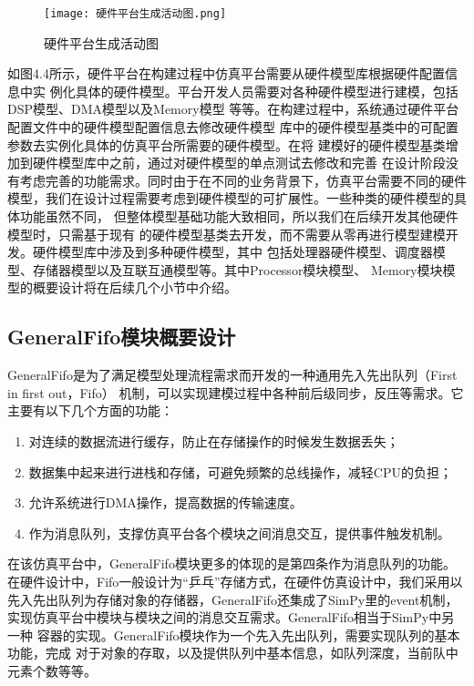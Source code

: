 \begin{figure}[h]
    \centering
    \texttt{[image: 硬件平台生成活动图.png]}
    \caption{硬件平台生成活动图}
    \label{fig:badge}
\end{figure}

如图4.4所示，硬件平台在构建过程中仿真平台需要从硬件模型库根据硬件配置信息中实
例化具体的硬件模型。平台开发人员需要对各种硬件模型进行建模，包括DSP模型、DMA模型以及Memory模型
等等。在构建过程中，系统通过硬件平台配置文件中的硬件模型配置信息去修改硬件模型
库中的硬件模型基类中的可配置参数去实例化具体的仿真平台所需要的硬件模型。在将
建模好的硬件模型基类增加到硬件模型库中之前，通过对硬件模型的单点测试去修改和完善
在设计阶段没有考虑完善的功能需求。同时由于在不同的业务背景下，仿真平台需要不同的硬件
模型，我们在设计过程需要考虑到硬件模型的可扩展性。一些种类的硬件模型的具体功能虽然不同，
但整体模型基础功能大致相同，所以我们在后续开发其他硬件模型时，只需基于现有
的硬件模型基类去开发，而不需要从零再进行模型建模开发。硬件模型库中涉及到多种硬件模型，其中
包括处理器硬件模型、调度器模型、存储器模型以及互联互通模型等。其中Processor模块模型、
Memory模块模型的概要设计将在后续几个小节中介绍。

\subsection{GeneralFifo模块概要设计}
GeneralFifo是为了满足模型处理流程需求而开发的一种通用先入先出队列（First in first out，Fifo）
机制\cite{31}，可以实现建模过程中各种前后级同步，反压等需求。它主要有以下几个方面的功能：

\begin{enumerate}
    \item 对连续的数据流进行缓存，防止在存储操作的时候发生数据丢失；
    \item 数据集中起来进行进栈和存储，可避免频繁的总线操作，减轻CPU的负担；
    \item 允许系统进行DMA操作，提高数据的传输速度。
    \item 作为消息队列，支撑仿真平台各个模块之间消息交互，提供事件触发机制。
\end{enumerate}

在该仿真平台中，GeneralFifo模块更多的体现的是第四条作为消息队列的功能。
在硬件设计中，Fifo一般设计为“乒乓”存储方式，在硬件仿真设计中，我们采用以
先入先出队列为存储对象的存储器，GeneralFifo还集成了SimPy里的event机制，
实现仿真平台中模块与模块之间的消息交互需求。GeneralFifo相当于SimPy中另一种
容器的实现。GeneralFifo模块作为一个先入先出队列，需要实现队列的基本功能，完成
对于对象的存取，以及提供队列中基本信息，如队列深度，当前队中元素个数等等。

